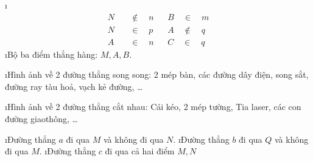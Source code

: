 \begin{Answer}{2}
		\begin{enumerate}[a),leftmargin=*]
			\i \begin{align*}
				N& \quad\boxed{\notin} \quad n && B \quad\boxed{\in} \quad m\\
				N& \quad\boxed{\in} \quad p && A \quad\boxed{\notin} \quad q\\
				A& \quad\boxed{\in} \quad n && C \quad\boxed{\in} \quad q
			\end{align*}
			\i Bộ ba điểm thẳng hàng:  $M,A,B$.
		\end{enumerate}
	
\end{Answer}
\begin{Answer}{3}
		\begin{enumerate}[--,leftmargin=*]
			\i Hình ảnh về 2 đường thẳng song song: 2 mép bàn, các đường dây điện, song sắt, đường ray tàu hoả, vạch kẻ đường, \ldots
			\begin{center}
			\end{center}
		\i Hình ảnh về 2 đường thẳng cắt nhau: Cái kéo, 2 mép tường, Tia laser, các con đường giao\linebreak thông, \ldots
		\begin{center}
		\end{center}
		\end{enumerate}
	
\end{Answer}
\begin{Answer}{4}
		\begin{enumerate}[a),leftmargin=*]
			\i Đường thẳng  $a$ đi qua $M$ và không đi qua $N$.
			\i Đường thẳng $b$ đi qua $Q$  và không đi qua $M$.
			\i Đường thẳng $c$ đi qua cả hai điểm $M,N$
		\end{enumerate}
	
\end{Answer}
